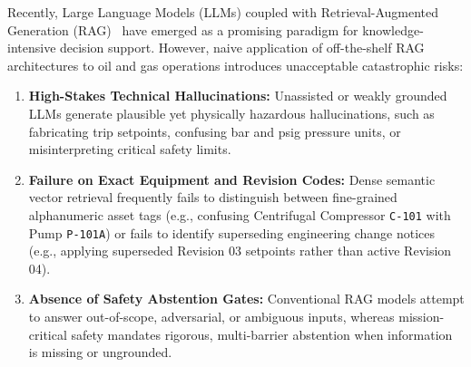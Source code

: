 Recently, Large Language Models (LLMs) coupled with Retrieval-Augmented Generation (RAG)~\cite{lewis2020retrieval,karpukhin2020dense} have emerged as a promising paradigm for knowledge-intensive decision support. However, naive application of off-the-shelf RAG architectures to oil and gas operations introduces unacceptable catastrophic risks:
\begin{enumerate}
    \item \textbf{High-Stakes Technical Hallucinations:} Unassisted or weakly grounded LLMs generate plausible yet physically hazardous hallucinations, such as fabricating trip setpoints, confusing bar and psig pressure units, or misinterpreting critical safety limits.
    \item \textbf{Failure on Exact Equipment and Revision Codes:} Dense semantic vector retrieval frequently fails to distinguish between fine-grained alphanumeric asset tags (e.g., confusing Centrifugal Compressor \texttt{C-101} with Pump \texttt{P-101A}) or fails to identify superseding engineering change notices (e.g., applying superseded Revision 03 setpoints rather than active Revision 04).
    \item \textbf{Absence of Safety Abstention Gates:} Conventional RAG models attempt to answer out-of-scope, adversarial, or ambiguous inputs, whereas mission-critical safety mandates rigorous, multi-barrier abstention when information is missing or ungrounded.
\end{enumerate}

